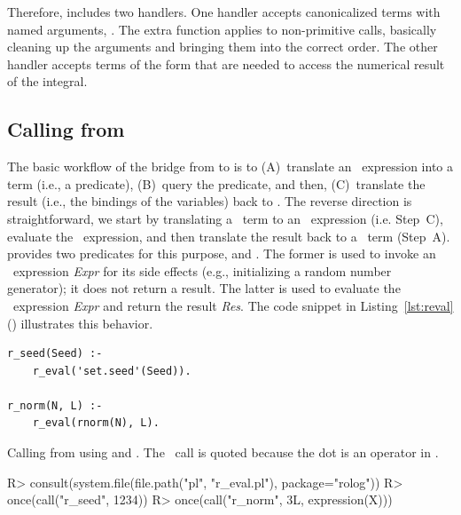 \documentclass[article]{jss}
\begin{document}
Therefore,  includes two handlers. One handler accepts
canonicalized terms with named 
arguments, . The extra
function  applies  to 
non-primitive  calls, basically cleaning up the arguments and
bringing them into the correct order. The other handler accepts terms of the
form  that are needed to access
the numerical result of the integral.

\subsection[Calling Prolog from R]{Calling  from }

The basic workflow of the bridge from  to  is
to (A)~translate an ~expression into a 
term (i.e., a predicate), (B)~query the predicate, and then, (C)~translate 
the result (i.e., the bindings of the variables) back to . The
reverse direction is straightforward, we start by translating 
a ~term to an ~expression (i.e. Step~C), evaluate
the ~expression, and then translate the result back to
a ~term (Step~A).  provides two predicates for this
purpose,  and . The
former is used to invoke an ~expression \emph{Expr} for its side
effects (e.g., initializing a random number generator); it does not return a
result. The latter is used to evaluate the ~expression \emph{Expr}
and return the result \emph{Res}. The code snippet in
Listing~\ref{lst:reval} () illustrates this behavior.

\begin{listing}
\begin{verbatim}
r_seed(Seed) :-
    r_eval('set.seed'(Seed)).

r_norm(N, L) :-
    r_eval(rnorm(N), L).
\end{verbatim}

\caption[Calling R from Prolog using r\_eval/1 and r\_eval/2.]{Calling  from  using 
  and . The ~call  is quoted because
  the dot is an operator in .}
\label{lst:reval}
\end{listing}

\begin{Schunk}
\begin{Sinput}
R> consult(system.file(file.path("pl", "r_eval.pl"), package="rolog"))
R> once(call("r_seed", 1234))
R> once(call("r_norm", 3L, expression(X)))
\end{Sinput}
\end{Schunk}
\end{document}
